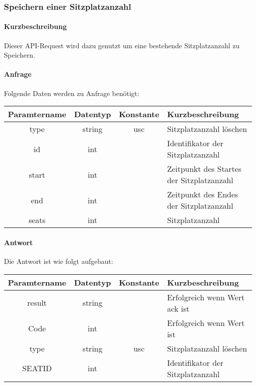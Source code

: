 \subsubsection{Speichern einer Sitzplatzanzahl}
\paragraph{Kurzbeschreibung}Dieser API-Request wird dazu genutzt um eine bestehende Sitzplatzanzahl zu Speichern.
\paragraph{Anfrage}Folgende Daten werden zu Anfrage benötigt:
\begin{table}[H]
	\begin{tabular}{|c|c|c|p{6.5cm}|}
		\hline
		\textbf{Paramtername} & \textbf{Datentyp} & \textbf{Konstante} & \textbf{Kurzbeschreibung}                                                                                               \\ \hline
		type                & string            & usc                & Sitzplatzanzahl löschen \\ \hline
		id                  & int               &                    & Identifikator der Sitzplatzanzahl \\ \hline
		start               & int               &                    & Zeitpunkt des Startes der Sitzplatzanzahl \\ \hline
		end                 & int               &                    & Zeitpunkt des Endes der Sitzplatzanzahl \\ \hline
		seats               & int               &                    & Sitzplatzanzahl \\ \hline
	\end{tabular}
\end{table}
\paragraph{Antwort}Die Antwort ist wie folgt aufgebaut:
\begin{table}[H]
	\begin{tabular}{|c|c|c|p{6.5cm}|}
		\hline
		\textbf{Paramtername} & \textbf{Datentyp} & \textbf{Konstante} & \textbf{Kurzbeschreibung}                                                                                               \\ \hline
		result              & string           &                 & Erfolgreich wenn Wert {\glqq ack\grqq} ist \\ \hline
		Code                & int              &                 & Erfolgreich wenn Wert {\glqq 0\grqq} ist \\ \hline
		type                & string           & usc             & Sitzplatzanzahl löschen \\ \hline
		SEATID              & int              &                 & Identifikator der Sitzplatzanzahl \\ \hline
	\end{tabular}
\end{table}

